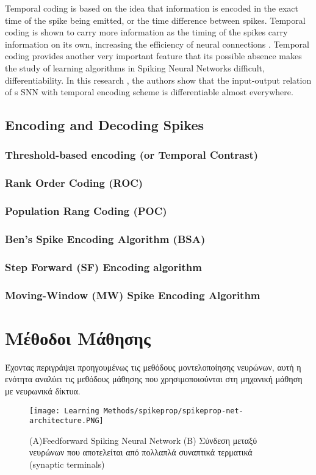 \documentclass[12pt]{report}
\begin{document}
Temporal coding is based on the idea that information is encoded in the exact time of the spike being emitted, or the time difference between spikes. Temporal coding is shown to carry more information as the timing of the spikes carry information on its own, increasing the efficiency of neural connections \cite{Mainen2009}. Temporal coding provides another very important feature that its possible absence makes the study of learning algorithms in Spiking Neural Networks difficult, differentiability. In this research \cite{Mostafa2018}, the authors show that the input-output relation of s SNN with temporal encoding scheme is differentiable almost everywhere. 

\subsection{Encoding and Decoding Spikes}
\subsubsection{Threshold-based encoding (or Temporal Contrast)}
\subsubsection{Rank Order Coding (ROC)}
\subsubsection{Population Rang Coding (POC)}
\subsubsection{Ben’s Spike Encoding Algorithm (BSA)}
\subsubsection{Step Forward (SF) Encoding algorithm}
\subsubsection{Moving-Window (MW) Spike Encoding Algorithm}
\section{Μέθοδοι Μάθησης}
Έχοντας περιγράψει προηγουμένως τις μεθόδους μοντελοποίησης νευρώνων, αυτή η ενότητα αναλύει τις μεθόδους μάθησης που χρησιμοποιούνται στη μηχανική μάθηση με νευρωνικά δίκτυα.
\begin{figure}[htp]
    \centering
    \texttt{[image: Learning Methods/spikeprop/spikeprop-net-architecture.PNG]}
    \caption{(A)\textlatin{Feedforward Spiking Neural Network}  (B) Σύνδεση μεταξύ νευρώνων που αποτελείται από πολλαπλά συναπτικά τερματικά (\textlatin{synaptic terminals})}
    \label{fig:spikeprop-net-architecture}
\end{figure}
\end{document}
